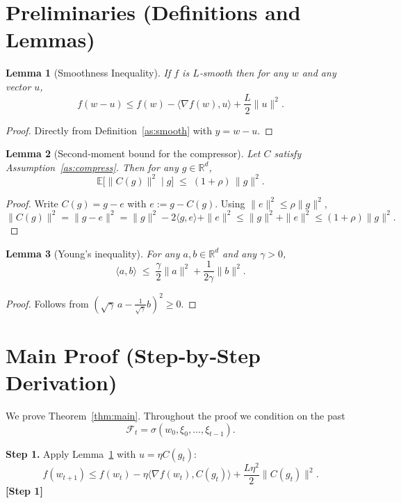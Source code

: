 \documentclass{article}
\newtheorem{lemma}{Lemma}
\begin{document}
\newpage

\section*{Preliminaries (Definitions and Lemmas)}
\begin{lemma}[Smoothness Inequality]\label{lem:smooth}
If $f$ is $L$‑smooth then for any $w$ and any vector $u$,
\[
f(w-u)\le f(w)-\langle\nabla f(w),u\rangle+\frac{L}{2}\|u\|^{2}.
\]
\end{lemma}
\begin{proof}
Directly from Definition~\ref{as:smooth} with $y=w-u$.
\end{proof}

\begin{lemma}[Second‑moment bound for the compressor]\label{lem:compress}
Let $C$ satisfy Assumption~\ref{as:compress}. Then for any $g\in\mathbb{R}^{d}$,
\[
\mathbb{E}\!\big[\|C(g)\|^{2}\mid g\big]
\;\le\;
(1+\rho)\,\|g\|^{2}.
\tag{3}
\]
\end{lemma}
\begin{proof}
Write $C(g)=g-e$ with $e:=g-C(g)$.  Using $\|e\|^{2}\le\rho\|g\|^{2}$,
\[
\|C(g)\|^{2}= \|g-e\|^{2}= \|g\|^{2}-2\langle g,e\rangle+\|e\|^{2}
\le \|g\|^{2}+ \|e\|^{2}\le (1+\rho)\|g\|^{2}.
\]
\end{proof}

\begin{lemma}[Young’s inequality]\label{lem:young}
For any $a,b\in\mathbb{R}^{d}$ and any $\gamma>0$,
\[
\langle a,b\rangle\;\le\;\frac{\gamma}{2}\|a\|^{2}+\frac{1}{2\gamma}\|b\|^{2}.
\tag{4}
\]
\end{lemma}
\begin{proof}
Follows from $(\sqrt{\gamma}\,a-\frac{1}{\sqrt{\gamma}}b)^{2}\ge0$.
\end{proof}

\newpage

\section*{Main Proof (Step‑by‑Step Derivation)}
We prove Theorem~\ref{thm:main}.  Throughout the proof we condition on the past
\[
\mathcal{F}_t=\sigma(w_0,\xi_0,\dots,\xi_{t-1}).
\]

\noindent\textbf{Step 1.} Apply Lemma~\ref{lem:smooth} with $u=\eta C(g_t)$:
\[
f(w_{t+1})\le f(w_t)-\eta\langle\nabla f(w_t),C(g_t)\rangle
               +\frac{L\eta^{2}}{2}\|C(g_t)\|^{2}.
\tag{5}
\]
\textbf{[Step 1]}
\end{document}
